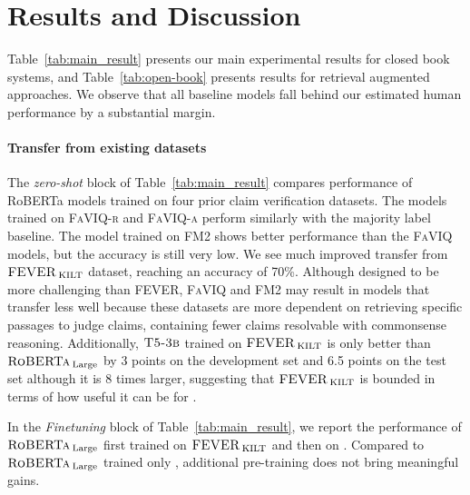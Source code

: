 \section{Results and Discussion}

Table~\ref{tab:main_result} presents our main experimental results for closed book systems, and Table~\ref{tab:open-book} presents results for retrieval augmented approaches. We observe that all baseline models fall behind our estimated human performance by a substantial margin. 

\paragraph{Transfer from existing datasets} The \emph{zero-shot} block of Table~\ref{tab:main_result} compares performance of RoBERTa models trained on four prior claim verification datasets. The models trained on \textsc{FaVIQ-r} and \textsc{FaVIQ-a} perform similarly with the majority label baseline. The model trained on \textsc{FM2} shows better performance than the \textsc{FaVIQ} models, but the accuracy is still very low. We see much improved transfer from $\textsc{FEVER}_{\:\text{KILT}}$ dataset, reaching an accuracy of 70\%. Although designed to be more challenging than FEVER, \textsc{FaVIQ} and \textsc{FM2} may result in models that transfer less well because these datasets are more dependent on retrieving specific passages to judge claims, containing fewer claims resolvable with commonsense reasoning. Additionally,  $\textsc{T5-3b}$ trained on $\textsc{FEVER}_{\:\text{KILT}}$ is only better than $\textsc{RoBERTa}_{\:\text{Large}}$ by 3 points on the development set and 6.5 points on the test set although it is 8 times larger, suggesting that $\textsc{FEVER}_{\:\text{KILT}}$ is bounded in terms of how useful it can be for \ours. 

In the \emph{Finetuning} block of Table~\ref{tab:main_result}, we report the performance of $\textsc{RoBERTa}_{\:\text{Large}}$ first trained on  $\textsc{FEVER}_{\:\text{KILT}}$ and then on \oursno. Compared to $\textsc{RoBERTa}_{\:\text{Large}}$ trained only \oursno, additional pre-training does not bring meaningful gains. 
 
